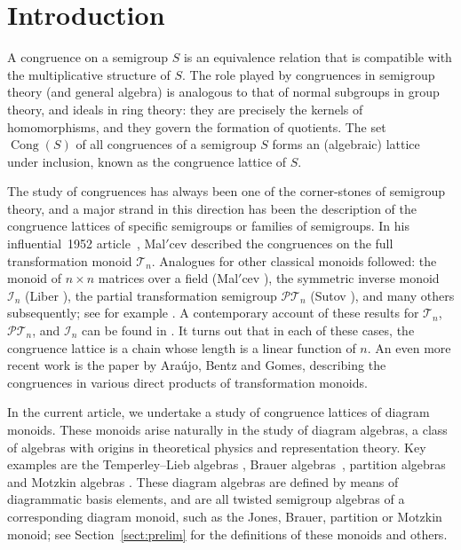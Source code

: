 \documentclass[11pt,a4paper]{article}
\newcommand{\PT}{\mathcal P\mathcal T}
\newcommand{\I}{\mathcal I}
\newcommand{\T}{\mathcal T}
\newcommand{\Cong}{\operatorname{Cong}}
\newcommand{\1}{\id_n}
\numberwithin{equation}{section}
\theoremstyle{definition}
\begin{document}
\section{Introduction}\label{sect:intro}
A {congruence} on a semigroup $S$ is an equivalence relation that is
compatible with the multiplicative structure of $S$.  The role played by
congruences in semigroup theory (and general algebra) is analogous to that of
normal subgroups in group theory, and ideals in ring theory: they are precisely the kernels of
homomorphisms, and they govern the formation of quotients.  The set $\Cong(S)$
of all congruences of a semigroup $S$ forms an (algebraic) lattice under
inclusion, known as the {congruence lattice} of $S$.  

The study of
congruences has always been one of the corner-stones of semigroup theory, and a
major strand in this direction has been the description of the congruence
lattices of specific semigroups or families of semigroups.
%
In his influential~1952 article~\cite{Malcev1952}, Mal$'$cev described the
congruences on the full transformation  monoid $\T_n$.  Analogues for other
classical monoids followed: the monoid of $n\times n$ matrices over a
field (Mal$'$cev \cite{Malcev1953}), the symmetric inverse monoid $\I_n$ (Liber
\cite{Liber1953}), the partial transformation semigroup $\PT_n$ (Sutov \cite{Sutov1961}), and many
others subsequently; see for example \cite{Aizenstat1962,Fernandes2001,MSS2000,Sutov1961_2}.
%
A contemporary account of these results for $\T_n$, $\PT_n$,
and $\I_n$ can be found in \cite[Section 6.3]{GMbook}.  It turns out that
in each of these cases, the congruence lattice is a chain whose length is a
linear function of $n$.  An even more recent work is the paper
\cite{ABG2016} by Ara\'{u}jo, Bentz and Gomes, describing the congruences in
various direct products of transformation monoids.  

In the current article, we undertake a study of congruence lattices of
{diagram monoids}.  These monoids arise naturally in the study of
{diagram algebras}, a class of algebras with origins in theoretical
physics and representation theory. Key examples are the
{Temperley--Lieb algebras} \cite{TL1971,Martin1994,BDP2002}, 
{Brauer algebras}~\cite{Brauer1937,MarMaz2014},
{partition algebras} \cite{Martin1994,Jones1994_2,HR2005}
and {Motzkin algebras} \cite{BH2014}.  
These diagram algebras are defined by means of diagrammatic basis elements, and
are all {twisted semigroup algebras} \cite{Wilcox2007} of a corresponding
diagram monoid, such as the {Jones},
{Brauer}, {partition} or {Motzkin monoid}; see
Section~\ref{sect:prelim} for the definitions of these monoids and others. 
\end{document}
